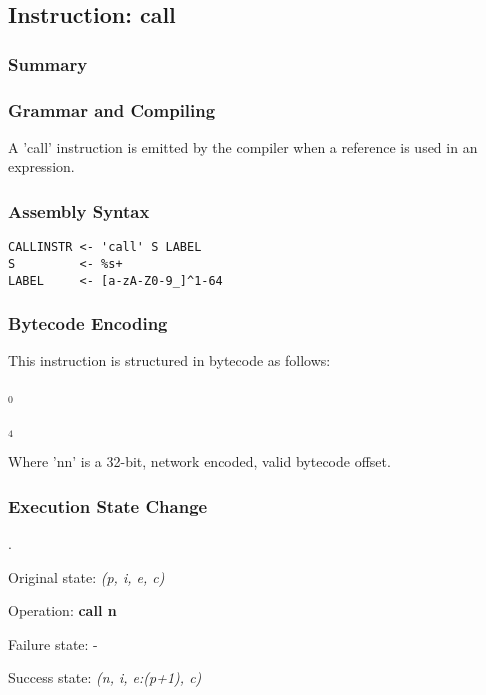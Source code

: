 \subsection{Instruction: call}

\subsubsection{Summary}

\subsubsection{Grammar and Compiling}

A 'call' instruction is emitted by the compiler when a reference is used
in an expression.

\subsubsection{Assembly Syntax}

\begin{myquote}
\begin{verbatim}
CALLINSTR <- 'call' S LABEL
S         <- %s+
LABEL     <- [a-zA-Z0-9_]^1-64

\end{verbatim}
\end{myquote}

\subsubsection{Bytecode Encoding}

This instruction is structured in bytecode as follows:

$_0$\ 


$_4$\

Where 'nn' is a 32-bit, network encoded, valid bytecode offset.

\subsubsection{Execution State Change}

.

Original state: \textit{(p, i, e, c)}

Operation: \textbf{call n}

Failure state: -

Success state: \textit{(n, i, e:(p+1), c)}

